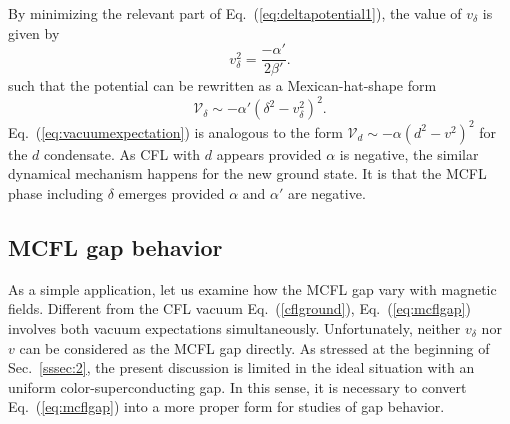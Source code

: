 \documentclass[prd, showpacs,nofootinbib,amsmath,amssymb]{revtex4}
\begin{document}
By minimizing the relevant part of Eq.~(\ref{eq:deltapotential1}), the value of $v_\delta$ is given by
\begin{equation}
\label{eq:vacuumexpectation}
v_\delta^2 = \frac{- \alpha'} {2\beta'}.
\end{equation}
such that the potential can be rewritten as a Mexican-hat-shape form
\begin{equation}
\label{eq:deltapotential}
\mathcal{V}_\delta \sim - \alpha'(\delta^2 - v_\delta^2)^2.
\end{equation}
Eq.~(\ref{eq:vacuumexpectation}) is analogous to the form $\mathcal{V}_d \sim - \alpha (d^2 - v^2)^2$
for the $d$ condensate.
As CFL with $d$ appears provided $\alpha$ is negative, the similar dynamical mechanism happens for
the new ground state. It is that the MCFL phase including $\delta$ emerges provided $\alpha$ and
$\alpha'$ are negative.

\subsection{MCFL gap behavior }
\label{sssec:3}

As a simple application, let us examine how the MCFL gap vary with magnetic fields.
Different from the CFL vacuum Eq.~(\ref{cflground}), Eq.~(\ref{eq:mcflgap}) involves both vacuum
expectations simultaneously. Unfortunately, neither $v_\delta$ nor $v$ can be considered as the
MCFL gap directly. As stressed at the beginning of Sec.~\ref{sssec:2}, the present discussion is
limited in the ideal situation with an uniform color-superconducting gap. In this sense, it is
necessary to convert Eq.~(\ref{eq:mcflgap}) into a more proper form for studies of gap behavior.
\end{document}
